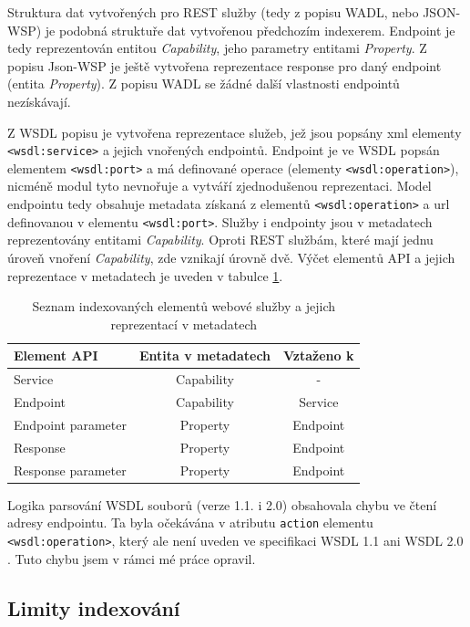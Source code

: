 \documentclass[czech,DP]{thesiskiv}
\begin{document}
Struktura dat vytvořených pro REST služby (tedy z popisu WADL, nebo JSON-WSP) je podobná struktuře dat vytvořenou předchozím indexerem. Endpoint je tedy reprezentován entitou \textit{Capability}, jeho parametry entitami \textit{Property}. Z popisu Json-WSP je ještě vytvořena reprezentace response pro daný endpoint (entita \textit{Property}). Z popisu WADL se žádné další vlastnosti endpointů nezískávají.

Z WSDL popisu je vytvořena reprezentace služeb, jež jsou popsány xml elementy \verb|<wsdl:service>| a jejich vnořených endpointů. Endpoint je ve WSDL popsán elementem \verb|<wsdl:port>| a má definované operace (elementy \verb|<wsdl:operation>|), nicméně modul tyto nevnořuje a vytváří zjednodušenou reprezentaci. Model endpointu tedy obsahuje metadata získaná z elementů \verb|<wsdl:operation>| a url definovanou v elementu \verb|<wsdl:port>|. Služby i endpointy jsou v metadatech reprezentovány entitami \textit{Capability}. Oproti REST službám, které mají jednu úroveň vnoření \textit{Capability}, zde vznikají úrovně dvě. Výčet elementů API a jejich reprezentace v metadatech je uveden v tabulce \ref{tab:ws-indexed}.

\begin{table}[h]
	\centering
	\begin{tabular}{|l | c | c |}
		\hline
		Element API & Entita v metadatech & Vztaženo k \\
		\hline
		\hline
		Service & Capability & - \\
		\hline
		Endpoint & Capability & Service \\
		\hline
		Endpoint parameter & Property & Endpoint \\
		\hline
		Response & Property & Endpoint \\
		\hline
		Response parameter & Property & Endpoint \\
		\hline
	\end{tabular}
	\caption{Seznam indexovaných elementů webové služby a jejich reprezentací v metadatech}
	\label{tab:ws-indexed}
\end{table}

Logika parsování WSDL souborů (verze 1.1. i 2.0) obsahovala chybu ve čtení adresy endpointu. Ta byla očekávána v atributu \verb|action| elementu \verb|<wsdl:operation>|, který ale není uveden ve specifikaci WSDL 1.1 \cite{wsdl1} ani WSDL 2.0 \cite{wsdl2}. Tuto chybu jsem v rámci mé práce opravil.

\subsection{Limity indexování}
\end{document}
